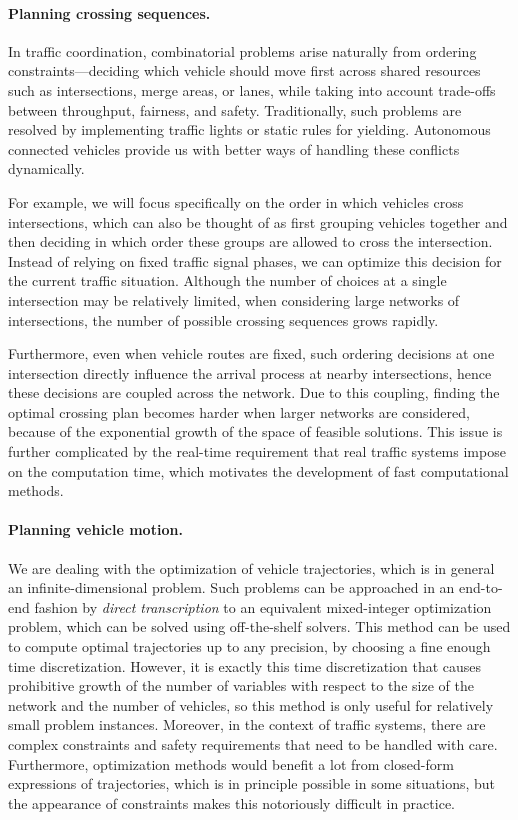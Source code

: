 \documentclass[a4paper]{report}
\theoremstyle{definition}
\theoremstyle{plain}
\begin{document}
\paragraph{Planning crossing sequences.}

In traffic coordination, combinatorial problems arise naturally from ordering
constraints---deciding which vehicle should move first across shared resources
such as intersections, merge areas, or lanes, while taking into account trade-offs
between throughput, fairness, and safety.
%
Traditionally, such problems are resolved by implementing traffic lights or
static rules for yielding.
%
Autonomous connected vehicles provide us with better ways of handling these
conflicts dynamically.

For example, we will focus specifically on the order in which vehicles cross
intersections, which can also be thought of as first grouping vehicles together
and then deciding in which order these groups are allowed to cross the
intersection.
%
Instead of relying on fixed traffic signal phases, we can optimize this decision
for the current traffic situation.
%
Although the number of choices at a single intersection may be relatively
limited, when considering large networks of intersections, the number of
possible crossing sequences grows rapidly.

Furthermore, even when vehicle routes are fixed, such ordering decisions at one
intersection directly influence the arrival process at nearby intersections,
hence these decisions are coupled across the network.
%
Due to this coupling, finding the optimal crossing plan becomes harder when
larger networks are considered, because of the exponential growth of the space
of feasible solutions.
%
This issue is further complicated by the real-time requirement that real traffic
systems impose on the computation time, which motivates the development of fast
computational methods.

\paragraph{Planning vehicle motion.}

We are dealing with the optimization of vehicle trajectories, which is in
general an infinite-dimensional problem.
%
Such problems can be approached in an end-to-end fashion by
\textit{direct transcription} to an equivalent mixed-integer optimization
problem, which can be solved using off-the-shelf solvers. This method can be
used to compute optimal trajectories up to any precision, by choosing a fine
enough time discretization. However, it is exactly this time discretization that
causes prohibitive growth of the number of variables with respect to the size of
the network and the number of vehicles, so this method is only useful for
relatively small problem instances.
%
Moreover, in the context of traffic systems, there are complex constraints and
safety requirements that need to be handled with care.
%
Furthermore, optimization methods would benefit a lot from closed-form
expressions of trajectories, which is in principle possible in some situations,
but the appearance of constraints makes this notoriously difficult in practice.
\end{document}
